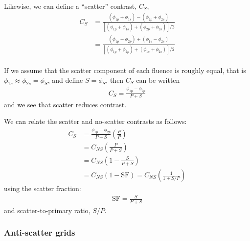 \documentclass[mphy386-notes.tex]{subfiles}
\begin{document}
Likewise, we can define a ``scatter'' contrast, $C_S$,
\begin{align}
  C_S &= \frac{(\phi_{1p} + \phi_{1s}) - (\phi_{2p} + \phi_{2s})}{[(\phi_{1p} + \phi_{1s}) + (\phi_{2p} + \phi_{2s})]/2}\\
      &= \frac{(\phi_{1p} - \phi_{2p}) + (\phi_{1s} - \phi_{2s})}{[(\phi_{1p} + \phi_{2p}) + (\phi_{1s} + \phi_{2s})]/2}\\
\end{align}

If we assume that the scatter component of each fluence is roughly equal, that is $\phi_{1s} \approx \phi_{2s} = \phi_S$, and define $S = \phi_S$, then $C_S$ can be written
\begin{align}
  C_S = \frac{\phi_{1p} - \phi_{2p}}{P + S}
\end{align}
and we see that scatter reduces contrast.

We can relate the scatter and no-scatter contrasts as follows:
\begin{align}
  C_S &= \frac{\phi_{1p} - \phi_{2p}}{P + S}\left(\frac{P}{P}\right)\\
      &= C_{NS}\left(\frac{P}{P + S}\right)\\
      &= C_{NS}\left(1 - \frac{S}{P + S}\right) \\
      &= C_{NS}(1 - \text{SF}) = C_{NS}\left(\frac{1}{1 + S/P}\right)
\end{align}
using the scatter fraction:
\begin{align}
  \text{SF} = \frac{S}{P + S}
\end{align}
and scatter-to-primary ratio, $S/P$. 

\subsubsection{Anti-scatter grids}

\pagebreak
\end{document}
